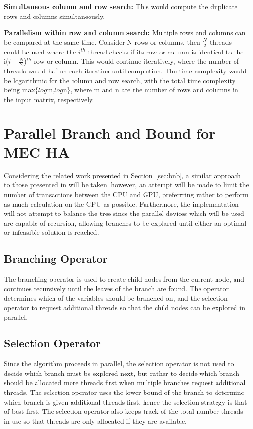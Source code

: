 \documentclass[10pt,twocolumn]{article}
\begin{document}
\textbf{Simultaneous column and row search:} This would compute the duplicate rows and columns simultaneously.

\textbf{Parallelism within row and column search:}
Multiple rows and columns can be compared at the same time. Consider N rows or columns, then $\frac{N}{2}$
threads could be used where the $i^{th}$ thread checks if its row or column is identical to the i($i +
\frac{N}{2}$)$^{th}$ row or column. This would continue iteratively, where the number of threads would haf on
each iteration until completion. The time complexity would be logarithmic for the column and row search, with
the total time complexity being max\{$log$m,$log$n\}, where m and n are the number of rows and columns in the
input matrix, respectively.

\section{ Parallel Branch and Bound for MEC HA } \label{sec:parbnb}

Considering the related work presented in Section~\ref{sec:bnb}, a similar approach to those presented in
\cite{melab:2012, chakroun:2012, chakroun:2013} will be taken, however, an attempt will be made to limit the
number of transactions between the CPU and GPU, preferrring rather to perform as much calculation on the GPU
as possible. Furthermore, the implementation will not attempt to balance the tree since the parallel devices
which will be used are capable of recursion, allowing branches to be explared until either an optimal or
infeasible solution is reached.

\subsection{Branching Operator}

The branching operator is used to create child nodes from the current node, and continues recursively until
the leaves of the branch are found. The operator determines which of the variables should be branched 
on, and the selection operator to request additional threads so that the child nodes can be explored in
parallel.

\subsection{Selection Operator}

Since the algorithm proceeds in parallel, the selection operator is not used to decide which branch must be
explored next, but rather to decide which branch should be allocated more threads first when multiple branches
request additional threads. The selection operator uses the lower bound of the branch to determine which
branch is given additional threads first, hence the selection strategy is that of best first. The selection
operator also keeps track of the total number threads in use so that threads are only allocated if they are
available.
\end{document}

